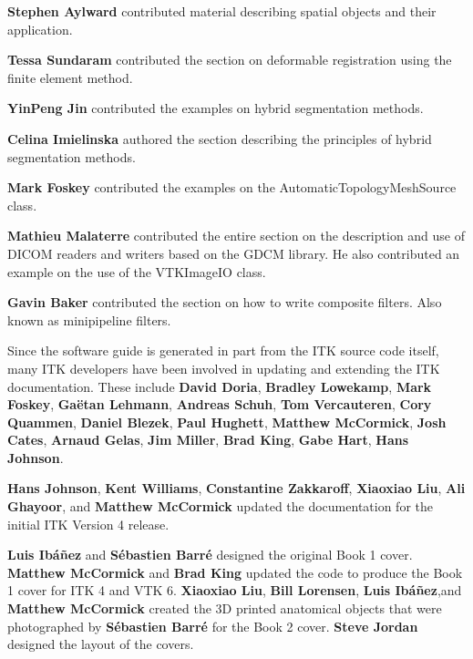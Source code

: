 {\bf Stephen Aylward} contributed material describing spatial objects and
their application.

{\bf Tessa Sundaram} contributed the section on deformable registration using
the finite element method.

{\bf YinPeng Jin} contributed the examples on  hybrid segmentation methods.

{\bf Celina Imielinska} authored the section describing the principles of
hybrid segmentation methods.

{\bf Mark Foskey} contributed the examples on the
AutomaticTopologyMeshSource class.

{\bf Mathieu Malaterre} contributed the entire section on the description and
use of DICOM readers and writers based on the GDCM library. He also contributed
an example on the use of the VTKImageIO class.

{\bf Gavin Baker} contributed the section on how to write composite filters.
Also known as minipipeline filters.

Since the software guide is generated in part from the ITK source code
itself, many ITK developers have been involved in updating and
extending the ITK documentation.  These include {\bf David Doria},
{\bf Bradley Lowekamp}, {\bf Mark Foskey}, {\bf Ga\"{e}tan Lehmann},
{\bf Andreas Schuh}, {\bf Tom Vercauteren}, {\bf Cory Quammen}, {\bf Daniel Blezek},
{\bf Paul Hughett}, {\bf Matthew McCormick}, {\bf Josh Cates}, {\bf Arnaud Gelas},
{\bf Jim Miller}, {\bf Brad King}, {\bf Gabe Hart}, {\bf Hans Johnson}.

{\bf Hans Johnson}, {\bf Kent Williams}, {\bf Constantine Zakkaroff}, {\bf
Xiaoxiao Liu}, {\bf Ali Ghayoor}, and {\bf Matthew McCormick} updated
the documentation for the initial ITK Version 4 release.

{\bf Luis Ib\'{a}\~{n}ez} and {\bf S\'{e}bastien Barr\'{e}} designed the
original Book 1 cover. {\bf Matthew McCormick} and {\bf Brad King} updated the
code to produce the Book 1 cover for ITK 4 and VTK 6. {\bf Xiaoxiao Liu},
{\bf Bill Lorensen}, {\bf Luis Ib\'{a}\~{n}ez},and {\bf Matthew McCormick}
created the 3D printed anatomical objects that were photographed by {\bf
S\'{e}bastien Barr\'{e}} for the Book 2 cover. {\bf Steve Jordan} designed the
layout of the covers.
